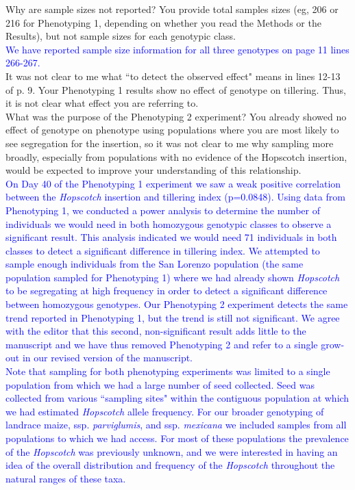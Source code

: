 \documentclass[11pt]{article}
\newcommand{\res}[1]{\noindent \textcolor{blue}{{#1}} \\}
\begin{document}
Why are sample sizes not reported?  You provide total samples sizes (eg, 206 or 216 for Phenotyping 1, depending on whether you read the Methods or the Results), but not sample sizes for each genotypic class.\\

\res{We have reported sample size information for all three genotypes on page 11 lines 266-267.} 

It was not clear to me what ``to detect the observed effect" means in lines 12-13 of p. 9.  Your Phenotyping 1 results show no effect of genotype on tillering.  Thus, it is not clear what effect you are referring to.\\

What was the purpose of the Phenotyping 2  experiment?  You already showed no effect of genotype on phenotype using populations where you are most likely to see segregation for the insertion, so it was not clear to me why sampling more broadly, especially from populations with no evidence of the Hopscotch insertion, would be expected to improve your understanding of this relationship.\\

\res{On Day 40 of the Phenotyping 1 experiment we saw a weak positive correlation between the \emph{Hopscotch} insertion and tillering index (p=0.0848).  
Using data from Phenotyping 1, we conducted a power analysis to determine the number of individuals we would need in both homozygous genotypic classes to observe a significant result.
This analysis indicated we would need 71 individuals in both classes to detect a significant difference in tillering index.  
We attempted to sample enough individuals from the San Lorenzo population (the same population sampled for Phenotyping 1) where we had already shown \emph{Hopscotch} to be segregating at high frequency in order to detect a significant difference between homozygous genotypes.  
Our Phenotyping 2 experiment detects the same trend reported in Phenotyping 1, but the trend is still not significant.
We agree with the editor that this second, non-significant result adds little to the manuscript and we have thus removed Phenotyping 2 and refer to a single grow-out in our revised version of the manuscript.}

\res{Note that sampling for both phenotyping experiments was limited to a single population from which we had a large number of seed collected. Seed was collected from various ``sampling sites" within the contiguous population at which we had estimated \emph{Hopscotch} allele frequency. For our broader genotyping of landrace maize, ssp. \emph{parviglumis}, and ssp. \emph{mexicana} we included samples from all populations to which we had access. For most of these populations the prevalence of the \emph{Hopscotch} was previously unknown, and we were interested in having an idea of the overall distribution and frequency of the \emph{Hopscotch} throughout the natural ranges of these taxa.}
\end{document}
